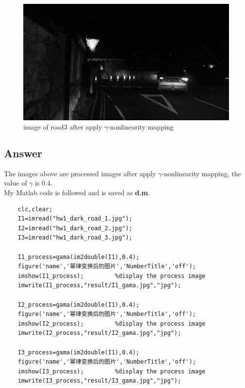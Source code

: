\documentclass[
	12pt, %
]{fphw}
\begin{document}
\begin{figure}[H]
 
	\centering
	\includegraphics[width=1\columnwidth]{T2/result/I3_gama.jpg} 
	\caption{image of road3 after apply $\gamma$-nonlinearity mapping}
	\label{fig24}
\end{figure}
\subsection*{Answer}
The images above are processed images after apply $\gamma$-nonlinearity mapping, the value of $\gamma$ is 0.4.\\
My Matlab code is followed and is saved as \textbf{d.m}.
\begin{lstlisting}
	clc,clear;
	I1=imread("hw1_dark_road_1.jpg");
	I2=imread("hw1_dark_road_2.jpg");
	I3=imread("hw1_dark_road_3.jpg");

	I1_process=gama(im2double(I1),0.4);
	figure('name','幂律变换后的图片','NumberTitle','off');
	imshow(I1_process);         %display the process image
	imwrite(I1_process,"result/I1_gama.jpg","jpg");

	I2_process=gama(im2double(I1),0.4);
	figure('name','幂律变换后的图片','NumberTitle','off');
	imshow(I2_process);         %display the process image
	imwrite(I2_process,"result/I2_gama.jpg","jpg");

	I3_process=gama(im2double(I1),0.4);
	figure('name','幂律变换后的图片','NumberTitle','off');
	imshow(I3_process);         %display the process image
	imwrite(I3_process,"result/I3_gama.jpg","jpg");
\end{lstlisting}
\end{document}
